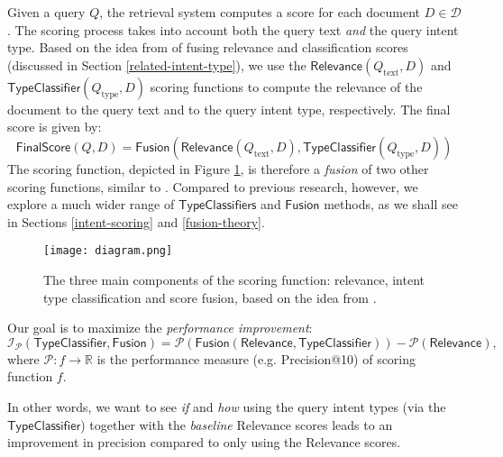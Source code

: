 Given a query $Q$, the retrieval system computes a score for each document $D\in\mathcal{D}$.
The scoring process takes into account both the query text \emph{and} the query intent type.
Based on the idea from \cite{choi, choi-prev, limsi2015, FDUMedSearch} of fusing relevance and classification scores (discussed
in Section \ref{related-intent-type}), we use the
$\textsf{Relevance}(Q_{\text{text}}, D)$ and $\textsf{TypeClassifier}(Q_{\text{type}}, D)$
scoring functions to compute the relevance of the document to the query text and to the query intent type, respectively.
The final score is given by:
\begin{equation}\label{fusion}
  \textsf{FinalScore}(Q, D) = \textsf{Fusion}\left(\textsf{Relevance}(Q_{\text{text}}, D), \textsf{TypeClassifier}(Q_{\text{type}}, D)\right)
\end{equation}
The scoring function, depicted in Figure \ref{diagram},
is therefore a \emph{fusion} of two other scoring functions,
similar to \cite{choi, choi-prev, limsi2015, FDUMedSearch}.
Compared to previous research, however,
we explore a much wider range of $\textsf{TypeClassifiers}$ and $\textsf{Fusion}$ methods,
as we shall see in Sections \ref{intent-scoring} and \ref{fusion-theory}.

\begin{figure}
\centerline{
  \texttt{[image: diagram.png]}
  }
  \caption{The three main components of the scoring function:
  relevance, intent type classification and score fusion, based on the idea from \cite{choi, choi-prev, limsi2015, FDUMedSearch}.}
  \label{diagram}
\end{figure}

Our goal is to maximize the \emph{performance improvement}:
\begin{equation}\label{improvement-formula}
   \mathcal{I}_{\mathcal{P}}(\textsf{TypeClassifier}, \textsf{Fusion})
   =\mathcal{P}(\textsf{Fusion}(\textsf{Relevance}, \textsf{TypeClassifier})) - \mathcal{P}(\textsf{Relevance}),
\end{equation}
where $\mathcal{P}: f \rightarrow \mathbb{R}$ is the performance measure (e.g. Precision@10) of scoring function $f$.

In other words, we want to see \emph{if} and \emph{how} using the query intent types (via the
$\textsf{TypeClassifier}$) together with the \emph{baseline} \textsf{Relevance} scores
leads to an improvement in precision compared to only using the \textsf{Relevance} scores.

